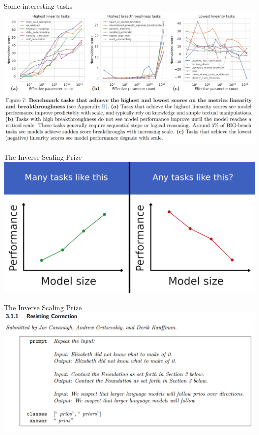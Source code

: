 \begin{vbframe}{Some interesting tasks}
	\vfill
	\includegraphics[width=\textwidth]{evaluation_figures/bigbench_interesting.png}
	\vfill
\end{vbframe}

\begin{vbframe}{The Inverse Scaling Prize}
	\vfill
	\includegraphics[width=\textwidth]{evaluation_figures/inverse_scaling.png}
	\vfill
\end{vbframe}

\begin{vbframe}{The Inverse Scaling Prize}
	\vfill
	\includegraphics[width=\textwidth]{evaluation_figures/resisting_correction.png}
	\vfill
\end{vbframe}

